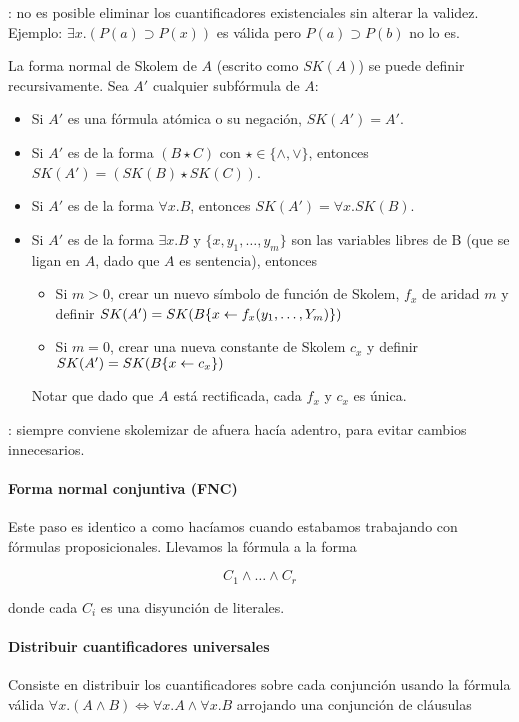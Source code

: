 : no es posible eliminar los cuantificadores existenciales sin alterar la validez. Ejemplo: $\exists x. (P(a) \supset P(x))$ es válida pero $P(a) \supset P(b)$ no lo es.

La forma normal de Skolem de $A$ (escrito como $SK(A)$) se puede definir recursivamente. Sea $A'$ cualquier subfórmula de $A$:
\begin{itemize}
  \item Si $A'$ es una fórmula atómica o su negación, $SK(A') = A'$.
  \item Si $A'$ es de la forma $(B \star C)$ con $\star \in \{\land, \lor\}$, entonces $SK(A') = (SK(B) \star SK(C))$.
  \item Si $A'$ es de la forma $\forall x.B$, entonces $SK(A') = \forall x.SK(B)$.
  \item Si $A'$ es de la forma $\exists x.B$ y $\{x, y_1, \dots, y_m\}$ son las variables libres de B (que se ligan en $A$, dado que $A$ es sentencia), entonces
    \begin{itemize}
      \item Si $m > 0$, crear un nuevo símbolo de función de Skolem, $f_x$ de aridad $m$ y definir $SK(A') = SK(B\{x \leftarrow f_x(y_1, \dots, Y_m)\})$
      \item Si $m = 0$, crear una nueva constante de Skolem $c_x$ y definir $SK(A') = SK(B\{x \leftarrow c_x\})$
    \end{itemize}
    Notar que dado que $A$ está rectificada, cada $f_x$ y $c_x$ es única.
\end{itemize}

: siempre conviene skolemizar de afuera hacía adentro, para evitar cambios innecesarios.

\paragraph{Forma normal conjuntiva (FNC)}

Este paso es identico a como hacíamos cuando estabamos trabajando con fórmulas proposicionales. Llevamos la fórmula a la forma

\[C_1 \land \dots \land C_r\]

 donde cada $C_i$ es una disyunción de literales.

\paragraph{Distribuir cuantificadores universales}

Consiste en distribuir los cuantificadores sobre cada conjunción usando la fórmula válida $\forall x.(A\land B) \iff \forall x. A \land \forall x. B$ arrojando una conjunción de cláusulas

